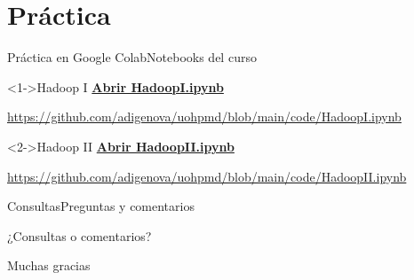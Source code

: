 \documentclass[handout,aspectratio=169,10pt]{beamer}
\begin{document}
\section{Práctica}
\begin{frame}{Práctica en Google Colab}{Notebooks del curso}
\begin{block}<1->{Hadoop I}
\href{https://github.com/adigenova/uohpmd/blob/main/code/HadoopI.ipynb}{\textbf{Abrir HadoopI.ipynb}}\par\vspace{2mm}
\small\url{https://github.com/adigenova/uohpmd/blob/main/code/HadoopI.ipynb}
\end{block}
\begin{block}<2->{Hadoop II}
\href{https://github.com/adigenova/uohpmd/blob/main/code/HadoopII.ipynb}{\textbf{Abrir HadoopII.ipynb}}\par\vspace{2mm}
\small\url{https://github.com/adigenova/uohpmd/blob/main/code/HadoopII.ipynb}
\end{block}

\end{frame}

\begin{frame}{Consultas}{Preguntas y comentarios}
\vfill\centering
{\fontsize{25}{30}\selectfont\color{uohblue}¿Consultas o comentarios?\par}
\vspace{9mm}
{\Large Muchas gracias\par}
\vfill
\end{frame}
\end{document}
